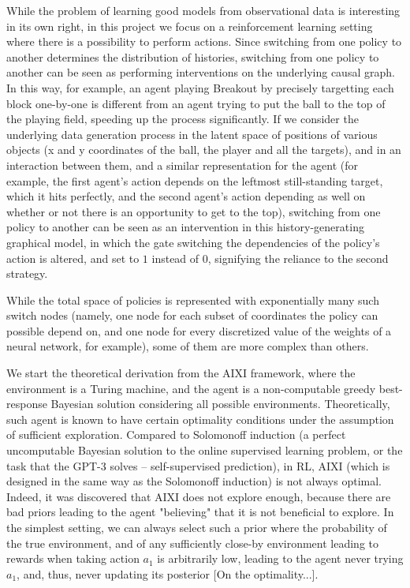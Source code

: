 \documentclass[a4paper,11pt,oneside]{report}
\begin{document}
While the problem of learning good models from observational data is interesting in its own right, in this project we focus on a reinforcement learning setting where there is a possibility to perform actions. Since switching from one policy to another determines the distribution of histories, switching from one policy to another can be seen as performing interventions on the underlying causal graph. In this way, for example, an agent playing Breakout by precisely targetting each block one-by-one is different from an agent trying to put the ball to the top of the playing field, speeding up the process significantly. If we consider the underlying data generation process in the latent space of positions of various objects (x and y coordinates of the ball, the player and all the targets), and in an interaction between them, and a similar representation for the agent (for example, the first agent's action depends on the leftmost still-standing target, which it hits perfectly, and the second agent's action depending as well on whether or not there is an opportunity to get to the top), switching from one policy to another can be seen as an intervention in this history-generating graphical model, in which the gate switching the dependencies of the policy's action is altered, and set to $1$ instead of $0$, signifying the reliance to the second strategy.

While the total space of policies is represented with exponentially many such switch nodes (namely, one node for each subset of coordinates the policy can possible depend on, and one node for every discretized value of the weights of a neural network, for example), some of them are more complex than others.

We start the theoretical derivation from the AIXI framework, where the environment is a Turing machine, and the agent is a non-computable greedy best-response Bayesian solution considering all possible environments. Theoretically, such agent is known to have certain optimality conditions under the assumption of sufficient exploration. Compared to Solomonoff  induction (a perfect uncomputable Bayesian solution to the online supervised learning problem, or the task that the GPT-3 solves -- self-supervised prediction), in RL, AIXI (which is designed in the same way as the Solomonoff induction) is not always optimal. Indeed, it was discovered that AIXI does not explore enough, because there are bad priors leading to the agent "believing" that it is not beneficial to explore. In the simplest setting, we can always select such a prior where the probability of the true environment, and of any sufficiently close-by environment leading to rewards when taking action $a_1$ is arbitrarily low, leading to the agent never trying $a_1$, and, thus, never updating its posterior [On the optimality...].
\end{document}

